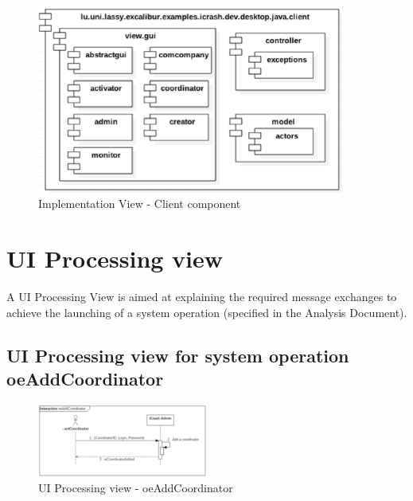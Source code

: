 \begin{figure}[h!]
	\centering
	\includegraphics[width=0.9\textwidth]{./images/impl_client.eps}
	\caption{Implementation View - Client component}
\end{figure}





\section{UI Processing view}
A \gls{UI Processing View} is aimed at explaining the required message
exchanges to achieve the launching of a system operation (specified in the \msrmessir
Analysis Document). 





\subsection{UI Processing view for system operation oeAddCoordinator}
\begin{figure}[h]
	\centering	
	\captionsetup{justification=centering}
	\includegraphics[width=0.5\textwidth]{./images/ui_oeAddCoordinator.eps}
	\caption{UI Processing view - oeAddCoordinator}
\end{figure}
 
